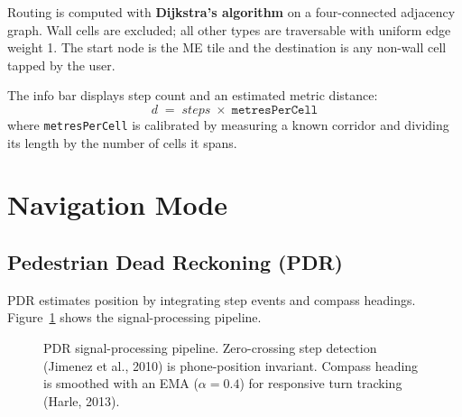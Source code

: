 \documentclass[12pt,a4paper]{article}
\begin{document}
Routing is computed with \textbf{Dijkstra's algorithm} on a four-connected
adjacency graph. Wall cells are excluded; all other types are traversable with
uniform edge weight 1. The start node is the ME tile and the destination is any
non-wall cell tapped by the user.

The info bar displays step count and an estimated metric distance:
\[
  d \;=\; \textit{steps} \;\times\; \texttt{metresPerCell}
\]
where \texttt{metresPerCell} is calibrated by measuring a known corridor and
dividing its length by the number of cells it spans.

\section{Navigation Mode}
\label{sec:nav}

\subsection{Pedestrian Dead Reckoning (PDR)}

PDR estimates position by integrating step events and compass headings.
Figure~\ref{fig:pdr} shows the signal-processing pipeline.

\begin{figure}[H]
\centering
{}
\caption{PDR signal-processing pipeline. Zero-crossing step detection
(Jimenez et al., 2010) is phone-position invariant. Compass heading is smoothed
with an EMA ($\alpha{=}0.4$) for responsive turn tracking (Harle, 2013).}
\label{fig:pdr}
\end{figure}
\end{document}
